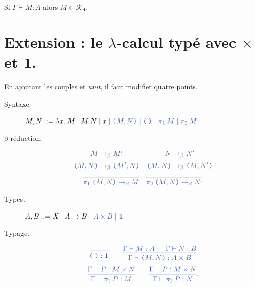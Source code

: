 \documentclass[./main]{subfiles}
\begin{document}
  \begin{crlr}
    Si $\Gamma \vdash M : A$ alors $M \in \mathcal{R}_A$.
  \end{crlr}

  \section{Extension : le $\lambda$-calcul typé avec $\times$ et $\mathbf{1}$.}
  En ajoutant les couples et \textit{unit}, il faut modifier quatre points.
  \begin{description}
    \item[Syntaxe.] \hfill $M, N ::= \lambda x.\: M  \mid M \: N  \mid x {\color{deepblue} {}\mid \texttt{(} M, N \texttt{)}  \mid \texttt{(\:)}  \mid \pi_1 \: M  \mid \pi_2 \: M}$ \hfill~
    \item[$\beta$-réduction.]
      \[
        \color{deepblue}
      \begin{prooftree} \hypo{M \to_\beta M'} \infer 1{\texttt{(} M, N \texttt{)} \to_\beta \texttt{(} M', N \texttt{)}} \end{prooftree} \quad
      \begin{prooftree} \hypo{N \to_\beta N'} \infer 1{\texttt{(} M, N \texttt{)} \to_\beta \texttt{(} M, N' \texttt{)}} \end{prooftree}\]
      \[
        \color{deepblue}
        \begin{prooftree} \infer 0{\pi_1 \: \texttt{(} M, N \texttt{)} \to_\beta M} \end{prooftree} \quad
        \begin{prooftree} \infer 0{\pi_2 \: \texttt{(} M, N \texttt{)} \to_\beta N} \end{prooftree}
      .\] 
    \item[Types.] \hfill $A, B ::= X  \mid A \to B {\color{deepblue} {} \mid A \times B  \mid \mathbf{1}}$ \hfill~
    \item[Typage.]
      \[
        \color{deepblue}
      \begin{prooftree}
        \infer 0{\texttt{(\:)} : \mathbf{1}}
      \end{prooftree}
      \quad\quad
      \begin{prooftree}
        \hypo{\Gamma \vdash M : A}
        \hypo{\Gamma \vdash N : B}
        \infer 2{\Gamma \vdash \texttt{(} M, N \texttt{)} : A \times B}
      \end{prooftree}
      \] 
      \[
        \color{deepblue}
      \begin{prooftree}
        \hypo{\Gamma \vdash P : M \times N}
        \infer 1{\Gamma \vdash \pi_1 \: P : M}
      \end{prooftree}
      \quad\quad
      \begin{prooftree}
        \hypo{\Gamma \vdash P : M \times N}
        \infer 1{\Gamma \vdash \pi_2 \: P : N}
      \end{prooftree}
      .\]
  \end{description}
\end{document}
